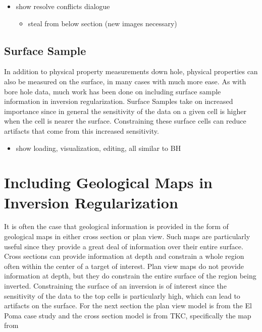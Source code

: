 \begin{itemize}
 \item show resolve conflicts dialogue
 \begin{itemize}
  \item steal from below section (new images necessary)
 \end{itemize}
\end{itemize}

\subsection{Surface Sample}
\label{subsec:SS}

In addition to physical property measurements down hole, physical properties can also be measured on the surface, in many cases with much more ease. As with bore hole data, much work  has been done on including surface sample information in inversion regularization. Surface Samples take on increased importance since in general the sensitivity of the data on a given cell is higher when the cell is nearer the surface. Constraining these surface cells can reduce artifacts that come from this increased sensitivity.

\begin{itemize}
 \item show loading, visualization, editing, all similar to BH
\end{itemize}


\section{Including Geological Maps in Inversion Regularization}
\label{sec:maps}

It is often the case that geological information is provided in the form of geological maps in either cross section or plan view. Such maps are particularly useful since they provide a great deal of information over their entire surface. Cross sections can provide information at depth and constrain a whole region often within the center of a target of interest. Plan view maps do not provide information at depth, but they do constrain the entire surface of the region being inverted.  Constraining the surface of an inversion is of interest since the sensitivity of the data to the top cells is particularly high, which can lead to artifacts on the surface. For the next section the plan view model is from the El Poma case study and the cross section model is from TKC, specifically the map from \citep{harder2006geology}

